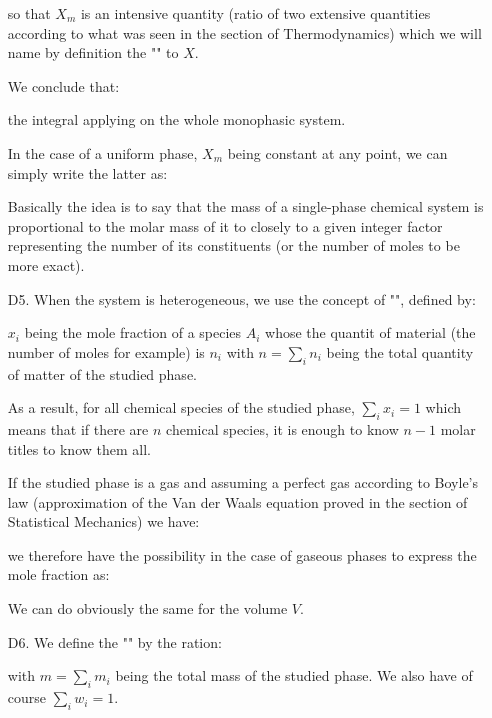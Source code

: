 \begin{enumerate}
		so that $X_m$ is an intensive quantity (ratio of two extensive quantities according to what was seen in the section of Thermodynamics) which we will name by definition the "" to $X$.
		
		We conclude that:
		
		the integral applying on the whole monophasic system.
		
		In the case of a uniform phase, $X_m$ being constant at any point, we can simply write the latter as:
		
		\begin{tcolorbox}[title=Remark,colframe=black,arc=10pt]
		Basically the idea is to say that the mass of a single-phase chemical system is proportional to the molar mass of it to closely to a given integer factor representing the number of its constituents (or the number of moles to be more exact).
		\end{tcolorbox}	
		
		\item[D5.] When the system is heterogeneous, we use the concept of "", defined by:
		
		$x_i$ being the mole fraction of a species $A_i$ whose the quantit of material (the number of moles for example) is $n_i$ with $n=\sum_i n_i$ being the total quantity of matter of the studied phase.
		
		As a result, for all chemical species of the studied phase, $\sum_i x_i=1$ which means that if there are $n$ chemical species, it is enough to  know $n-1$ molar titles to know them all.
	
		If the studied phase is a gas and assuming a perfect gas according to Boyle's law (approximation of the Van der Waals equation proved in the section of Statistical Mechanics) we have:
		
		we therefore have the possibility in the case of gaseous phases to express the mole fraction as:
		
		\begin{tcolorbox}[title=Remark,colframe=black,arc=10pt]
		We can do obviously the same for the volume $V$.
		\end{tcolorbox}	
		
		\item[D6.] We define the "" by the ration:
		
		with $m=\sum_i m_i$ being the total mass of the studied phase. We also have of course $\sum_i w_i=1$.
		

\end{enumerate}
